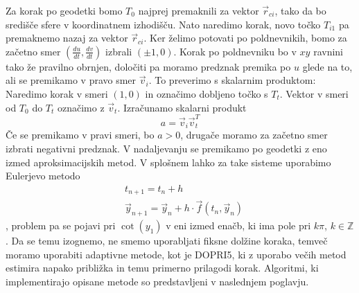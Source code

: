 \documentclass[titlepage]{article}
\begin{document}
Za korak po geodetki bomo \( T_{0} \) najprej premaknili za vektor \( \vec{r}_{ci} \), tako da bo središče sfere v koordinatnem izhodišču. Nato naredimo
korak, novo točko \( T_{i1} \) pa premaknemo nazaj za vektor \( \vec{r}_{ci} \).
Ker želimo potovati po poldnevnikih, bomo za začetno smer \(\left( \frac{du}{dt}, \frac{dv}{dt} \right) \) izbrali \(\left( \pm1, 0 \right) \). Korak po poldnevniku bo v \( xy \) ravnini tako že pravilno obrnjen, določiti pa moramo predznak premika po \( u \) glede na to, ali se premikamo v pravo smer \( \vec{v}_{i} \). To preverimo s skalarnim produktom:
\bigskip
\newline
Naredimo korak v smeri \(\left( 1, 0 \right) \) in označimo dobljeno točko s \( T_{t} \). Vektor v smeri od \( T_{0} \) do \( T_{t} \) označimo z \( \vec{v}_{t} \).
Izračunamo skalarni produkt
\begin{equation} \label{e:dirCorr}
    a= \vec{v}_{i} \vec{v}_{t}^T
\end{equation}
Če se premikamo v pravi smeri, bo \( a > 0 \), drugače moramo za začetno smer izbrati negativni predznak.
\bigskip
\newline
V nadaljevanju se premikamo po geodetki z eno izmed aproksimacijskih metod. V splošnem lahko za take sisteme uporabimo Eulerjevo metodo
\begin{equation} \label{e:euler}
    \begin{split}
        &t_{n+1}=t_{n}+h \\
        &\vec{y}_{n+1}=\vec{y}_{n}+h \cdot \vec{f}(t_{n}, \vec{y}_{n})
    \end{split}
\end{equation},
problem pa se pojavi pri \( \cot(y_{1}) \) v eni izmed enačb, ki ima pole pri
\( k\pi \), \( k \in \mathbb{Z} \). Da se temu izognemo, ne smemo uporabljati fiksne dolžine koraka, temveč moramo uporabiti adaptivne metode, kot je DOPRI5,
ki z uporabo večih metod estimira napako približka in temu primerno prilagodi korak.
\bigskip
\newline
Algoritmi, ki implementirajo opisane metode so predstavljeni v naslednjem poglavju.
\newpage
\end{document}
